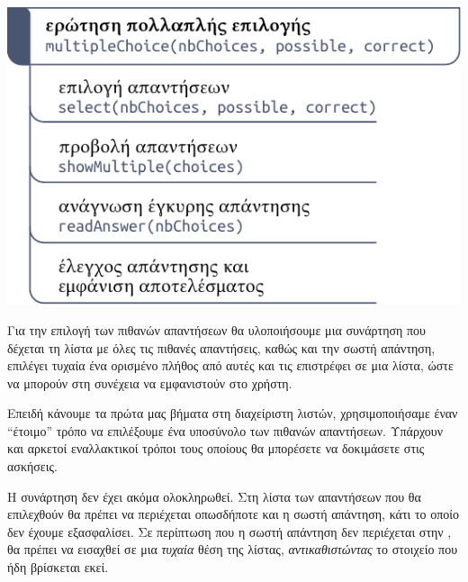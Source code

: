 \documentclass[a4paper,11pt,oneside]{book}
\begin{document}
\begin{center}
    \includegraphics[scale=\scaling]{illustrations/subproblems.pdf}
\end{center}

Για την επιλογή των πιθανών απαντήσεων θα υλοποιήσουμε μια συνάρτηση που δέχεται τη λίστα με όλες τις πιθανές απαντήσεις, καθώς και την σωστή απάντηση, επιλέγει τυχαία ένα ορισμένο πλήθος από αυτές και τις επιστρέφει σε μια λίστα, ώστε να μπορούν στη συνέχεια να εμφανιστούν στο χρήστη.



Επειδή κάνουμε τα πρώτα μας βήματα στη διαχείριστη λιστών, χρησιμοποιήσαμε έναν ``έτοιμο'' τρόπο να επιλέξουμε ένα υποσύνολο των πιθανών απαντήσεων. Υπάρχουν και αρκετοί εναλλακτικοί τρόποι τους οποίους θα μπορέσετε να δοκιμάσετε στις ασκήσεις.

Η συνάρτηση δεν έχει ακόμα ολοκληρωθεί. Στη λίστα  των απαντήσεων που θα επιλεχθούν θα πρέπει να περιέχεται οπωσδήποτε και η σωστή απάντηση, κάτι το οποίο δεν έχουμε εξασφαλίσει. Σε περίπτωση που η σωστή απάντηση δεν περιέχεται στην , θα πρέπει να εισαχθεί σε μια \emph{τυχαία} θέση της λίστας, \emph{αντικαθιστώντας} το στοιχείο που ήδη βρίσκεται εκεί.
\end{document}
